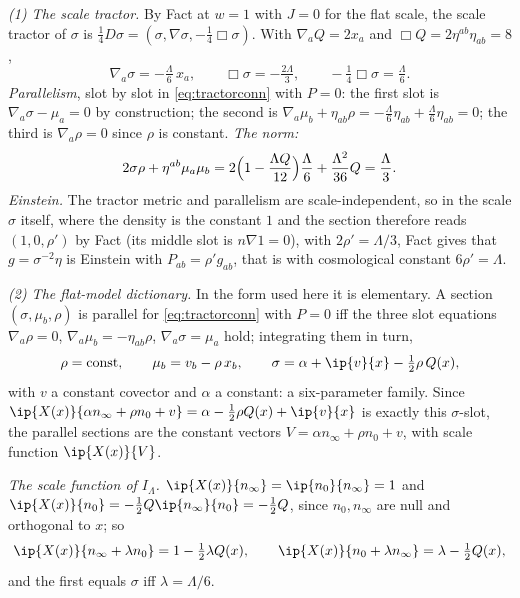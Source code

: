 \emph{(1) The scale tractor.} By Fact  at $w = 1$ with $J = 0$ for the flat scale, the scale tractor of $\sigma$ is $\tfrac14 D\sigma = (\sigma, \nabla\sigma, -\tfrac14\Box\sigma)$. With $\nabla_{a}Q = 2x_{a}$ and $\Box Q = 2\eta^{ab}\eta_{ab} = 8$,
\[
\nabla_{a}\sigma = -\tfrac{\Lambda}{6}\,x_{a}, \qquad \Box\sigma = -\tfrac{2\Lambda}{3}, \qquad -\tfrac14\Box\sigma = \tfrac{\Lambda}{6}.
\]
\emph{Parallelism}, slot by slot in \eqref{eq:tractorconn} with $P = 0$: the first slot is $\nabla_{a}\sigma - \mu_{a} = 0$ by construction; the second is $\nabla_{a}\mu_{b} + \eta_{ab}\rho = -\tfrac{\Lambda}{6}\eta_{ab} + \tfrac{\Lambda}{6}\eta_{ab} = 0$; the third is $\nabla_{a}\rho = 0$ since $\rho$ is constant. \emph{The norm:}
\[
2\sigma\rho + \eta^{ab}\mu_{a}\mu_{b} = 2\Bigl(1 - \frac{\Lambda Q}{12}\Bigr)\frac{\Lambda}{6} + \frac{\Lambda^{2}}{36}Q = \frac{\Lambda}{3}.
\]
\emph{Einstein.} The tractor metric and parallelism are scale-independent, so in the scale $\sigma$ itself, where the density is the constant $1$ and the section therefore reads $(1, 0, \rho')$ by Fact  (its middle slot is $n\nabla 1 = 0$), with $2\rho' = \Lambda/3$, Fact  gives that $g = \sigma^{-2}\eta$ is Einstein with $P_{ab} = \rho' g_{ab}$, that is with cosmological constant $6\rho' = \Lambda$.

\emph{(2) The flat-model dictionary.} In the form used here it is elementary. A section $(\sigma, \mu_{b}, \rho)$ is parallel for \eqref{eq:tractorconn} with $P = 0$ iff the three slot equations $\nabla_{a}\rho = 0$, $\nabla_{a}\mu_{b} = -\eta_{ab}\rho$, $\nabla_{a}\sigma = \mu_{a}$ hold; integrating them in turn,
\[
\rho = \text{const}, \qquad \mu_{b} = v_{b} - \rho\, x_{b}, \qquad \sigma = \alpha + \ip{v}{x} - \tfrac12\rho\, Q(x),
\]
with $v$ a constant covector and $\alpha$ a constant: a six-parameter family. Since $\ip{X(x)}{\alpha n_{\infty} + \rho n_{0} + v} = \alpha - \tfrac12\rho Q(x) + \ip{v}{x}$ is exactly this $\sigma$-slot, the parallel sections are the constant vectors $V = \alpha n_{\infty} + \rho n_{0} + v$, with scale function $\ip{X(x)}{V}$.

\emph{The scale function of $I_{\Lambda}$.} $\ip{X(x)}{n_{\infty}} = \ip{n_{0}}{n_{\infty}} = 1$ and $\ip{X(x)}{n_{0}} = -\tfrac12 Q\ip{n_{\infty}}{n_{0}} = -\tfrac12 Q$, since $n_{0}, n_{\infty}$ are null and orthogonal to $x$; so
\[
\ip{X(x)}{n_{\infty} + \lambda n_{0}} = 1 - \tfrac12\lambda Q(x), \qquad \ip{X(x)}{n_{0} + \lambda n_{\infty}} = \lambda - \tfrac12 Q(x),
\]
and the first equals $\sigma$ iff $\lambda = \Lambda/6$.

